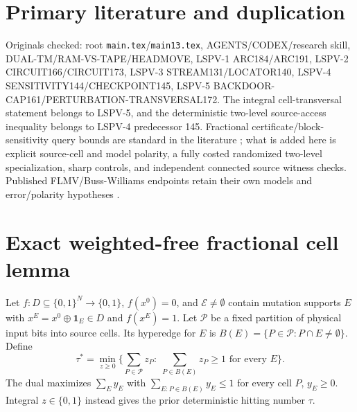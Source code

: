 \documentclass[11pt]{article}
\begin{document}
\section{Primary literature and duplication}
Originals checked: root \texttt{main.tex}/\texttt{main13.tex}, AGENTS/CODEX/research skill, DUAL-TM/RAM-VS-TAPE/HEADMOVE, LSPV-1 ARC184/ARC191, LSPV-2 CIRCUIT166/CIRCUIT173, LSPV-3 STREAM131/LOCATOR140, LSPV-4 SENSITIVITY144/CHECKPOINT145, LSPV-5 BACKDOOR-CAP161/PERTURBATION-TRANSVERSAL172. The integral cell-transversal statement belongs to LSPV-5, and the deterministic two-level source-access inequality belongs to LSPV-4 predecessor 145. Fractional certificate/block-sensitivity query bounds are standard in the literature \cite{aaronson,ambainis}; what is added here is explicit source-cell and model polarity, a fully costed randomized two-level specialization, sharp controls, and independent connected source witness checks. Published FLMV/Buss-Williams endpoints retain their own models and error/polarity hypotheses \cite{flmv,bw}.

\section{Exact weighted-free fractional cell lemma}
Let $f:D\subseteq\{0,1\}^N\to\{0,1\}$, $f(x^0)=0$, and $\mathcal E\ne\emptyset$ contain mutation supports $E$ with $x^E=x^0\oplus\mathbf1_E\in D$ and $f(x^E)=1$. Let $\mathcal P$ be a fixed partition of physical input bits into source cells. Its hyperedge for $E$ is $B(E)=\{P\in\mathcal P:P\cap E\ne\emptyset\}$. Define
\[
\tau^*=\min_{z\ge0}\{\sum_{P\in\mathcal P}z_P:\;\sum_{P\in B(E)}z_P\ge1\text{ for every }E\}.
\]
The dual maximizes $\sum_Ey_E$ with $\sum_{E:P\in B(E)}y_E\le1$ for every cell $P$, $y_E\ge0$. Integral $z\in\{0,1\}$ instead gives the prior deterministic hitting number $\tau$.
\end{document}
